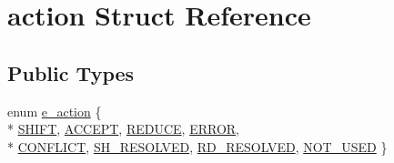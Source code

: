 \hypertarget{structaction}{\section{action Struct Reference}
\label{structaction}
}
\subsection*{Public Types}
\begin{DoxyCompactItemize}
\item 
enum \hyperlink{structaction_a03e1ad674211aa3a02d2ceeb227684ff}{e\-\_\-action} \{ \\*
\hyperlink{structaction_a03e1ad674211aa3a02d2ceeb227684ffa41d13d1f9d507da000d9db44e13202c1}{S\-H\-I\-F\-T}, 
\hyperlink{structaction_a03e1ad674211aa3a02d2ceeb227684ffaf2ea356f7bdcb9df92db8313e563b309}{A\-C\-C\-E\-P\-T}, 
\hyperlink{structaction_a03e1ad674211aa3a02d2ceeb227684ffa1d487b21d83be8fb45d98e54e59cd883}{R\-E\-D\-U\-C\-E}, 
\hyperlink{structaction_a03e1ad674211aa3a02d2ceeb227684ffaf4acf04ebe89bc09a46b9ba457457c2b}{E\-R\-R\-O\-R}, 
\\*
\hyperlink{structaction_a03e1ad674211aa3a02d2ceeb227684ffab4e8e44b43e073532eb3870420d954ef}{C\-O\-N\-F\-L\-I\-C\-T}, 
\hyperlink{structaction_a03e1ad674211aa3a02d2ceeb227684ffa493519f05032f7c7f545a44817d968a5}{S\-H\-\_\-\-R\-E\-S\-O\-L\-V\-E\-D}, 
\hyperlink{structaction_a03e1ad674211aa3a02d2ceeb227684ffa0da72b82caea59937b6f27b7749d21a1}{R\-D\-\_\-\-R\-E\-S\-O\-L\-V\-E\-D}, 
\hyperlink{structaction_a03e1ad674211aa3a02d2ceeb227684ffa63e69c79bab4ab29f58fe94a283e3c42}{N\-O\-T\-\_\-\-U\-S\-E\-D}
 \}
\end{DoxyCompactItemize}
